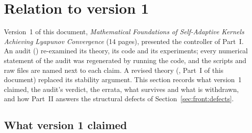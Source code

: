 \section{Relation to version 1}\label{sec:version1}

Version~1 of this document, \emph{Mathematical Foundations of Self-Adaptive Kernels Achieving Lyapunov Convergence}
(14 pages), presented the controller of Part~I. An audit () re-examined its theory, its code and
its experiments; every numerical statement of the audit was regenerated by running the code, and the scripts and raw
files are named next to each claim. A revised theory (, Part~I of this document) replaced its
stability argument. This section records what version~1 claimed, the audit's verdict, the errata, what survives and
what is withdrawn, and how Part~II answers the structural defects of Section~\ref{sec:front:defects}.

\subsection{What version 1 claimed}

